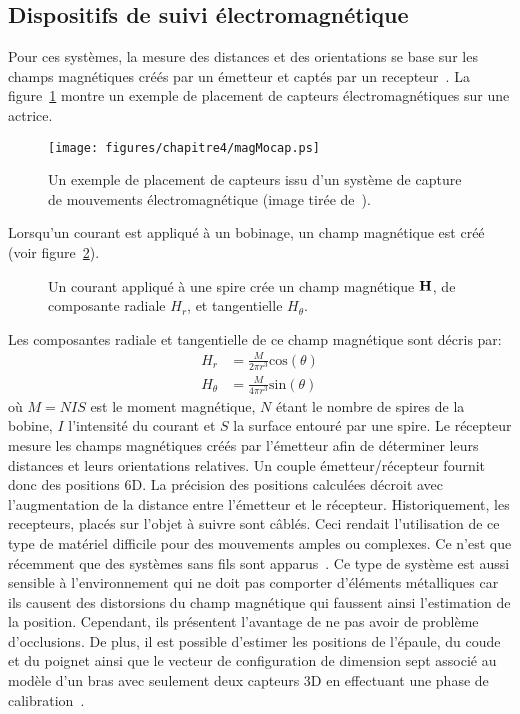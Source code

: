 \subsection{Dispositifs de suivi électromagnétique}
Pour ces systèmes, la mesure des distances et des orientations se base sur
les champs magnétiques créés par un émetteur et captés par un recepteur~\cite{raab79}.
La figure~\ref{fig:magMocap} montre un exemple de placement de capteurs électromagnétiques
sur une actrice.
\begin{figure}[p]
  \begin{center}
    \texttt{[image: figures/chapitre4/magMocap.ps]}
  \end{center}
  \caption[Capteurs magnétiques.]{Un exemple de placement de capteurs issu d'un système de capture de mouvements électromagnétique (image tirée de~\cite{bodenheimer97}).}
  \label{fig:magMocap}
\end{figure}
Lorsqu'un courant est appliqué à un bobinage, un champ magnétique est créé (voir figure~\ref{fig:ringMagnetic}).
\begin{figure}[p]
  \begin{center}
    \resizebox{0.9\textwidth}{!}{
    
    }
  \end{center}
  \caption[Fonctionnement d'un capteurs magnétique.]{Un courant appliqué à une spire crée un champ magnétique ${\mathbf{H}}$, de composante radiale $H_r$,
  et tangentielle $H_\theta$.}
  \label{fig:ringMagnetic}
\end{figure}
\FloatBarrier
Les composantes radiale et tangentielle de ce champ magnétique sont décris par:
\begin{align}
  H_r & =  \frac{M}{2\pi r^3}\mathrm{cos}(\theta)\\
  H_\theta & =  \frac{M}{4\pi r^3}\mathrm{sin}(\theta)
  \label{eq:magField}
\end{align}
\noindent où $M = N I S$ est le moment magnétique, $N$ étant le nombre de spires
de la bobine, $I$ l'intensité du courant et $S$ la surface entouré par une spire.
Le récepteur mesure les champs magnétiques créés par l'émetteur afin de 
déterminer leurs distances et leurs orientations relatives.
Un couple émetteur/récepteur fournit donc des positions 6D.
La précision des positions calculées décroit avec l'augmentation de la distance
entre l'émetteur et le récepteur.
Historiquement, les recepteurs, placés sur l'objet à suivre sont c\^ablés.
Ceci rendait l'utilisation de ce type de matériel difficile pour des mouvements amples
ou complexes. Ce n'est que récemment que des systèmes sans fils sont apparus~\cite{vanacht07}.
Ce type de système est aussi sensible à l'environnement qui
ne doit pas comporter d'éléments métalliques car ils causent des
distorsions du champ magnétique qui faussent ainsi l'estimation
de la position. Cependant, ils présentent
l'avantage de ne pas avoir de problème d'occlusions.
De plus, il est possible d'estimer 
les positions de l'épaule, du coude et du poignet ainsi que le vecteur
de configuration de dimension sept associé au modèle d'un bras avec seulement deux capteurs 3D
en effectuant une phase de calibration~\cite{rezzoug10}.
